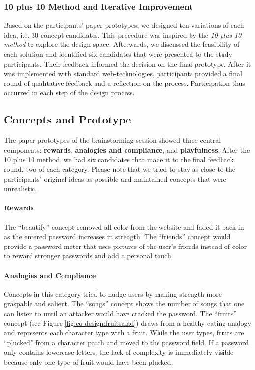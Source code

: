 \subsubsection{10 plus 10 Method and Iterative Improvement}
Based on the participants' paper prototypes, we designed ten variations of each idea, i.e. 30 concept candidates. This procedure was inspired by the \textit{10 plus 10 method} to explore the design space. 
Afterwards, we discussed the feasibility of each solution and identified six candidates that were presented to the study participants. Their feedback informed the decision on the final prototype. After it was implemented with standard web-technologies, participants provided a final round of qualitative feedback and a reflection on the process. Participation thus occurred in each step of the design process. 

\subsection{Concepts and Prototype}
The paper prototypes of the brainstorming session showed three central components: \textbf{rewards}, \textbf{analogies and compliance}, and \textbf{playfulness}. After the 10 plus 10 method, we had six candidates that made it to the final feedback round, two of each category. Please note that we tried to stay as close to the participants' original ideas as possible and maintained concepts that were unrealistic. 
\paragraph{Rewards} The ``beautify'' concept removed all color from the website and faded it back in as the entered password increases in strength. The ``friends'' concept would provide a password meter that uses pictures of the user's friends instead of color to reward stronger passwords and add a personal touch. 
\paragraph{Analogies and Compliance}
Concepts in this category tried to nudge users by making strength more graspable and salient. The ``songs'' concept shows the number of songs that one can listen to until an attacker would have cracked the password. The ``fruits'' concept (see Figure \ref{fig:co-design:fruitsalad}) draws from a healthy-eating analogy and represents each character type with a fruit. While the user types, fruits are ``plucked'' from a character patch and moved to the password field. If a password only contains lowercase letters, the lack of complexity is immediately visible because only one type of fruit would have been plucked. 
